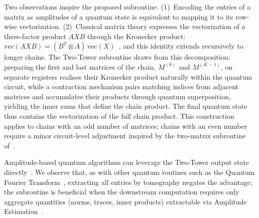 \documentclass[a4paper,UKenglish,cleveref,autoref,thm-restate]{socg-lipics-v2021}
\begin{document}
Two observations inspire the proposed subroutine. (1)~Encoding the entries of a matrix as amplitudes of a quantum state is equivalent to mapping it to its row-wise vectorization.
(2)~Classical matrix theory expresses the vectorization of a three-factor product $AXB$ through the Kronecker product: $\mathrm{vec}(AXB) = (B^T \otimes A)\,\mathrm{vec}(X)$~\cite{horn2012matrix}, and this identity extends recursively to longer chains. The Two-Tower subroutine draws from this decomposition: preparing the first and last matrices of the chain, $M^{(0)}$ and $M^{(K-1)}$, on separate registers realises their Kronecker product naturally within the quantum circuit, while a contraction mechanism pairs matching indices from adjacent matrices and accumulates their products through quantum superposition, yielding the inner sums that define the chain product. The final quantum state thus contains the vectorization of the full chain product. This construction applies to chains with an odd number of matrices; chains with an even number require a minor circuit-level adjustment inspired by the two-matrix subroutine of~\cite{bernasconiMatMul}. 

Amplitude-based quantum algorithms can leverage the Two-Tower output state directly~\cite{antonioli2025outlier,bernasconi2024quantum,poggiali2023quantum,poggiali2026more}. We observe that, as with other quantum routines such as the Quantum Fourier Transform~\cite{nielsen2010quantum}, extracting all entries by tomography negates the advantage; the subroutine is beneficial when the downstream computation requires only aggregate quantities (norms, traces, inner products) extractable via Amplitude Estimation~\cite{harrow2009quantum,PhysRevLett.120.050502}.
\end{document}

